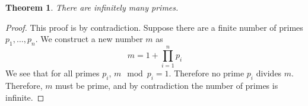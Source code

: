 \documentclass[12pt]{article}
\newtheorem{theorem}{Theorem}
\begin{document}
\begin{theorem}
There are infinitely many primes.
\end{theorem}
\begin{proof}
This proof is by contradiction. Suppose there are a finite number of primes $p_1,\ldots,p_n$. We construct a new number $m$ as
\[ m = 1 + \prod_{i = 1}^n p_i\]
We see that for all primes $p_i$, $m \mod p_i = 1$. Therefore no prime $p_i$ divides $m$. Therefore, $m$ must be prime, and by contradiction the number of primes is infinite.
\end{proof}
\end{document}
